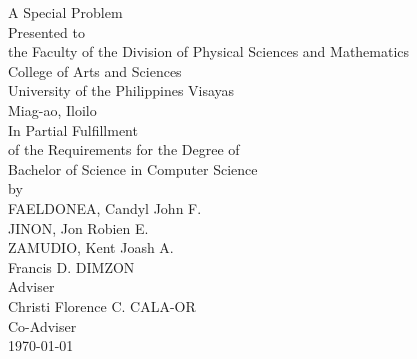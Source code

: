 \begin{titlepage}
\centering


\vspace{0.875cm}
A Special Problem\\
Presented to\\
the Faculty of the Division of Physical Sciences and Mathematics\\
College of Arts and Sciences\\
University of the Philippines Visayas\\
Miag-ao, Iloilo\\
\vspace{0.875cm}
In Partial Fulfillment\\
of the Requirements for the Degree of\\
Bachelor of Science in Computer Science\\
\vspace{1.1cm} %
by\\
\vspace{0.1cm}
FAELDONEA, Candyl John F. \\
JINON, Jon Robien E. \\
ZAMUDIO, Kent Joash A. \\
\vspace{0.875cm}
Francis D. DIMZON \\
Adviser\\
Christi Florence C. CALA-OR \\
Co-Adviser\\
\vspace{0.875cm}
\today
\end{titlepage}
